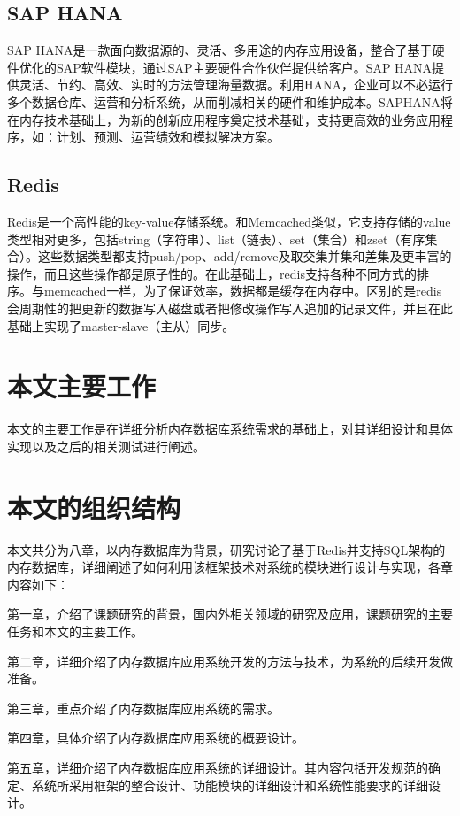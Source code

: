 \documentclass{zjutthesis}
\begin{document}
\subsection{SAP HANA}
SAP HANA是一款面向数据源的、灵活、多用途的内存应用设备，整合了基于硬件优化的SAP软件模块，通过SAP主要硬件合作伙伴提供给客户。SAP HANA提供灵活、节约、高效、实时的方法管理海量数据。利用HANA，企业可以不必运行多个数据仓库、运营和分析系统，从而削减相关的硬件和维护成本。SAPHANA将在内存技术基础上，为新的创新应用程序奠定技术基础，支持更高效的业务应用程序，如：计划、预测、运营绩效和模拟解决方案。

\subsection{Redis}
Redis是一个高性能的key-value存储系统。和Memcached类似，它支持存储的value类型相对更多，包括string（字符串）、list（链表）、set（集合）和zset（有序集合）。这些数据类型都支持push/pop、add/remove及取交集并集和差集及更丰富的操作，而且这些操作都是原子性的。在此基础上，redis支持各种不同方式的排序。与memcached一样，为了保证效率，数据都是缓存在内存中。区别的是redis会周期性的把更新的数据写入磁盘或者把修改操作写入追加的记录文件，并且在此基础上实现了master-slave（主从）同步。

\section{本文主要工作}
本文的主要工作是在详细分析内存数据库系统需求的基础上，对其详细设计和具体实现以及之后的相关测试进行阐述。

\section{本文的组织结构}
本文共分为八章，以内存数据库为背景，研究讨论了基于Redis并支持SQL架构的内存数据库，详细阐述了如何利用该框架技术对系统的模块进行设计与实现，各章内容如下：

第一章，介绍了课题研究的背景，国内外相关领域的研究及应用，课题研究的主要任务和本文的主要工作。

第二章，详细介绍了内存数据库应用系统开发的方法与技术，为系统的后续开发做准备。

第三章，重点介绍了内存数据库应用系统的需求。

第四章，具体介绍了内存数据库应用系统的概要设计。

第五章，详细介绍了内存数据库应用系统的详细设计。其内容包括开发规范的确定、系统所采用框架的整合设计、功能模块的详细设计和系统性能要求的详细设计。
\end{document}
